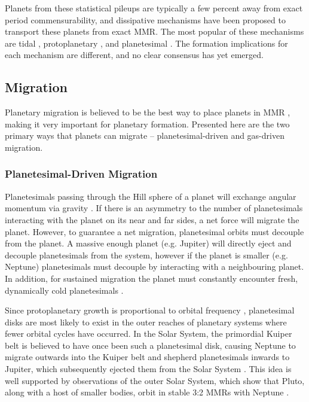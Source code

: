 Planets from these statistical pileups are typically a few percent away from exact period commensurability, and dissipative mechanisms have been proposed to transport these planets from exact MMR. 
The most popular of these mechanisms are tidal \citep{LithwickWu2012, Batygin2013, Delisle2014}, protoplanetary \citep{Rein2012b, Baruteau2013, Goldreich2014}, and planetesimal \citep{Moore2013, Chatterjee2015}.
The formation implications for each mechanism are different, and no clear consensus has yet emerged.


\subsection{Migration}
\label{sec:migration}
Planetary migration is believed to be the best way to place planets in MMR \citep[e.g.][]{Lee2002}, making it very important for planetary formation.  
Presented here are the two primary ways that planets can migrate -- planetesimal-driven and gas-driven migration.

\subsubsection{Planetesimal-Driven Migration}
Planetesimals passing through the Hill sphere of a planet will exchange angular momentum via gravity \citep{Ida2000, Kirsh2009}.
If there is an asymmetry to the number of planetesimals interacting with the planet on its near and far sides, a net force will migrate the planet. 
However, to guarantee a net migration, planetesimal orbits must decouple from the planet. 
A massive enough planet (e.g. Jupiter) will directly eject and decouple planetesimals from the system, however if the planet is smaller (e.g. Neptune) planetesimals must decouple by interacting with a neighbouring planet. 
In addition, for sustained migration the planet must constantly encounter fresh, dynamically cold planetesimals \citep{Gomes2004}.  

Since protoplanetary growth is proportional to orbital frequency \citep[e.g.][]{Rafikov2003}, planetesimal disks are most likely to exist in the outer reaches of planetary systems where fewer orbital cycles have occurred. 
In the Solar System, the primordial Kuiper belt is believed to have once been such a planetesimal disk, causing Neptune to migrate outwards into the Kuiper belt and shepherd planetesimals inwards to Jupiter, which subsequently ejected them from the Solar System \citep{Fernandez1984}.
This idea is well supported by observations of the outer Solar System, which show that Pluto, along with a host of smaller bodies, orbit in stable 3:2 MMRs with Neptune \citep{Malhotra1993, Malhotra1995}.

